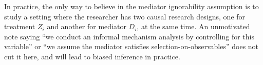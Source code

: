 In practice, the only way to believe in the mediator ignorability assumption is to study a setting where the researcher has two causal research designs, one for treatment $Z_i$ and another for mediator $D_i$, at the same time.
An unmotivated note saying 
``we conduct an informal mechanism analysis by controlling for this variable''
or
``we assume the mediator satisfies selection-on-observables''
does not cut it here, and will lead to biased inference in practice.

% 
% 
% 
